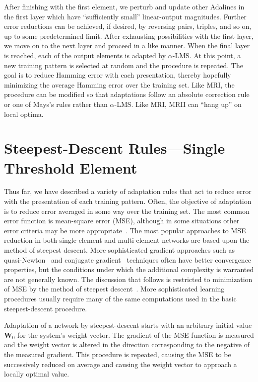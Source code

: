 \documentclass[10pt,twocolumn]{article}
\newcommand{\W}{\bm{W}}
\begin{document}
After finishing with the first element, we perturb and update other Adalines in
the first layer which have ``sufficiently small'' linear-output magnitudes.
Further error reductions can be achieved, if desired, by reversing pairs, triples,
and so on, up to some predetermined limit. After exhausting possibilities with the
first layer, we move on to the next layer and proceed in a like manner. When the
final layer is reached, each of the output elements is adapted by $\alpha$-LMS. At
this point, a new training pattern is selected at random and the procedure is
repeated. The goal is to reduce Hamming error with each presentation, thereby
hopefully minimizing the average Hamming error over the training set. Like MRI,
the procedure can be modified so that adaptations follow an absolute correction
rule or one of Mays's rules rather than $\alpha$-LMS. Like MRI, MRII can ``hang
up'' on local optima.

\section{Steepest-Descent Rules---Single Threshold Element}
Thus far, we have described a variety of adaptation rules that act to reduce error
with the presentation of each training pattern. Often, the objective of adaptation
is to reduce error averaged in some way over the training set. The most common
error function is mean-square error (MSE), although in some situations other error
criteria may be more appropriate~\cite{walach,baumwilczek,solla}. The most popular
approaches to MSE reduction in both single-element and multi-element networks are
based upon the method of steepest descent. More sophisticated gradient approaches
such as quasi-Newton~\cite{asp,parker87,owens} and conjugate
gradient~\cite{owens,luenberger} techniques often have better convergence
properties, but the conditions under which the additional complexity is warranted
are not generally known. The discussion that follows is restricted to
minimization of MSE by the method of steepest descent~\cite{southwell,wilde}. More
sophisticated learning procedures usually require many of the same computations
used in the basic steepest-descent procedure.

Adaptation of a network by steepest-descent starts with an arbitrary initial value
$\W_0$ for the system's weight vector. The gradient of the MSE function is measured
and the weight vector is altered in the direction corresponding to the negative of
the measured gradient. This procedure is repeated, causing the MSE to be
successively reduced on average and causing the weight vector to approach a locally
optimal value.
\end{document}
